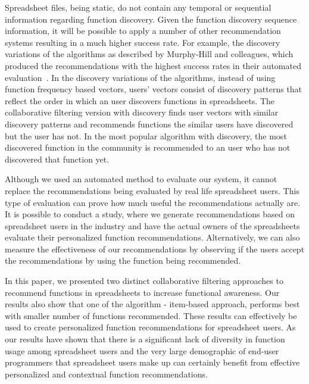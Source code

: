 \documentclass{article} %
\begin{document}
Spreadsheet files, being static, do not contain any temporal or sequential information regarding function discovery. Given the function discovery sequence information, it will be possible to apply a number of other recommendation systems resulting in a much higher success rate. For example, the discovery variations of the algorithms as described by Murphy-Hill and colleagues, which produced the recommendations with the highest success rates in their automated evaluation~\cite{murphy2012improving}. In the discovery variations of the algorithms, instead of using function frequency based vectors, users' vectors consist of discovery patterns that reflect the order in which an user discovers functions in spreadsheets. The collaborative filtering version with discovery finds user vectors with similar discovery patterns and recommends functions the similar users have discovered but the user has not. In the most popular algorithm with discovery, the most discovered function in the community is recommended to an user who has not discovered that function yet.

Although we used an automated method to evaluate our system, it cannot replace the recommendations being evaluated by real life spreadsheet users. This type of evaluation can prove how much useful the recommendations actually are. It is possible to conduct a study, where we generate recommendations based on spreadsheet users in the industry and have the actual owners of the spreadsheets evaluate their personalized function recommendations. Alternatively, we can also measure the effectiveness of our recommendations by observing if the users accept the recommendations by using the function being recommended.

In this paper, we presented two distinct collaborative filtering approaches to recommend functions in spreadsheets to increase functional awareness. Our results also show that one of the algorithm - item-based approach, performs best with smaller number of functions recommended. These results can effectively be used to create personalized function recommendations for spreadsheet users. As our results have shown that there is a significant lack of diversity in function usage among spreadsheet users and the very large demographic of end-user programmers that spreadsheet users make up can certainly benefit from effective personalized and contextual function recommendations.



\end{document}
